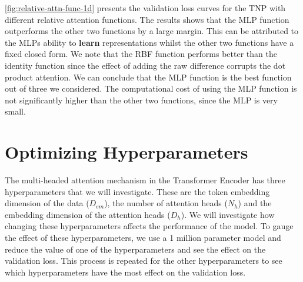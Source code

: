 \documentclass[../../main.tex]{subfiles}
\begin{document}
\autoref{fig:relative-attn-func-1d} presents the validation loss curves for the TNP with different relative attention functions. The results shows that the MLP function outperforms the other two functions by a large margin. This can be attributed to the MLPs ability to \textbf{learn} representations whilst the other two functions have a fixed closed form. We note that the RBF function performs better than the identity function since the effect of adding the raw difference corrupts the dot product attention. We can conclude that the MLP function is the best function out of three we considered. The computational cost of using the MLP function is not significantly higher than the other two functions, since the MLP is very small.



\section{Optimizing Hyperparameters}

The multi-headed attention mechanism in the Transformer Encoder has three hyperparameters that we will investigate. These are the token embedding dimension of the data ($D_{em}$), the number of attention heads ($N_h$) and the embedding dimension of the attention heads ($D_h$). We will investigate how changing these hyperparameters affects the performance of the model. To gauge the effect of these hyperparameters, we use a 1 million parameter model and reduce the value of one of the hyperparameters and see the effect on the validation loss. This process is repeated for the other hyperparameters to see which hyperparameters have the most effect on the validation loss. 
\end{document}
